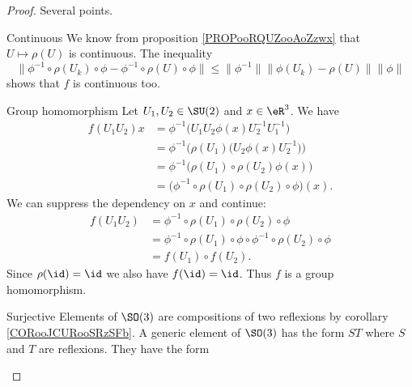 \begin{proof}
    Several points.
    \begin{subproof}
        \item[Continuous]
            We know from proposition \ref{PROPooRQUZooAoZzwx} that \( U\mapsto \rho(U)\) is continuous. The inequality
            \begin{equation}
                \| \phi^{-1}\circ\rho(U_k)\circ \phi-\phi^{-1}\circ\rho(U)\circ\phi \|\leq \| \phi^{-1} \|\| \phi(U_k)-\rho(U) \|\| \phi \|
            \end{equation}
            shows that \( f\) is continuous too.
        \item[Group homomorphism]
            Let \( U_1,U_2\in \SU(2)\) and \( x\in \eR^3\). We have
            \begin{subequations}
                \begin{align}
                    f(U_1U_2)x&=\phi^{-1}\big( U_1U_2\phi(x)U_2^{-1}U_1^{-1} \big)\\
                    &=\phi^{-1}\Big( \rho(U_1)\big( U_2\phi(x)U_2^{-1} \big) \Big)\\
                    &=\phi^{-1}\big( \rho(U_1)\circ\rho(U_2)\phi(x) \big)\\
                    &=\big( \phi^{-1}\circ\rho(U_1)\circ\rho(U_2)\circ\phi \big)(x).
                \end{align}
            \end{subequations}
            We can suppress the dependency on \( x\) and continue:
            \begin{subequations}
                \begin{align}
                    f(U_1U_2)&=\phi^{-1}\circ\rho(U_1)\circ\rho(U_2)\circ\phi\\
                    &=\phi^{-1}\circ\rho(U_1)\circ\phi\circ\phi^{-1}\circ\rho(U_2)\circ\phi\\
                    &=f(U_1)\circ f(U_2).
                \end{align}
            \end{subequations}
            Since \( \rho(\id)=\id\) we also have \( f(\id)=\id\). Thus \( f\) is a group homomorphism.
        \item[Surjective]
            Elements of \( \SO(3)\) are compositions of two reflexions by corollary \ref{CORooJCURooSRzSFb}. A generic element of \( \SO(3)\) has the form \(ST \) where \( S\) and \( T\) are reflexions. They have the form
            \begin{equation}

\end{equation}
\end{subproof}
\end{proof}

